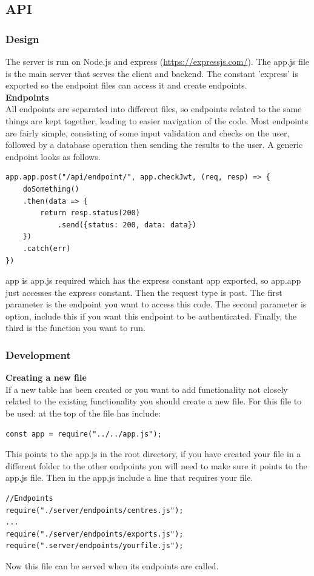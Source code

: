 \documentclass[12pt]{article}
\begin{document}
\subsection{API}
\subsubsection{Design}
The server is run on Node.js and express (\href{https://expressjs.com/}{https://expressjs.com/}). The app.js file is the main server that serves the client and backend. The constant 'express' is exported so the endpoint files can access it and create endpoints.\\

\noindent
\textbf{Endpoints}\\
\noindent
All endpoints are separated into different files, so endpoints related to the same things are kept together, leading to easier navigation of the code. Most endpoints are fairly simple, consisting of some input validation and checks on the user, followed by a database operation then sending the results to the user. A generic endpoint looks as follows.

\begin{lstlisting}
app.app.post("/api/endpoint/", app.checkJwt, (req, resp) => {
	doSomething()
	.then(data => {
		return resp.status(200)
			.send({status: 200, data: data})
	})
	.catch(err)
})
\end{lstlisting}
app is app.js required which has the express constant app exported, so app.app just accesses the express constant. Then the request type is post. The first parameter is the endpoint you want to access this code. The second parameter is option, include this if you want this endpoint to be authenticated. Finally, the third is the function you want to run.

\subsubsection{Development}
\textbf{Creating a new file}\\
\noindent
If a new table has been created or you want to add functionality not closely related to the existing functionality you should create a new file. For this file to be used: at the top of the file has include:
\begin{lstlisting}
const app = require("../../app.js");
\end{lstlisting}
This points to the app.js in the root directory, if you have created your file in a different folder to the other endpoints you will need to make sure it points to the app.js file. Then in the app.js include a line that requires your file.
\begin{lstlisting}
//Endpoints
require("./server/endpoints/centres.js");
...
require("./server/endpoints/exports.js");
require(".server/endpoints/yourfile.js");
\end{lstlisting}
Now this file can be served when its endpoints are called.\\
\end{document}
